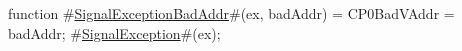 function  #\hyperref[sailMIPSzSignalExceptionBadAddr]{SignalExceptionBadAddr}#(ex, badAddr) =
  {
    CP0BadVAddr = badAddr;
    #\hyperref[sailMIPSzSignalException]{SignalException}#(ex);
  }
